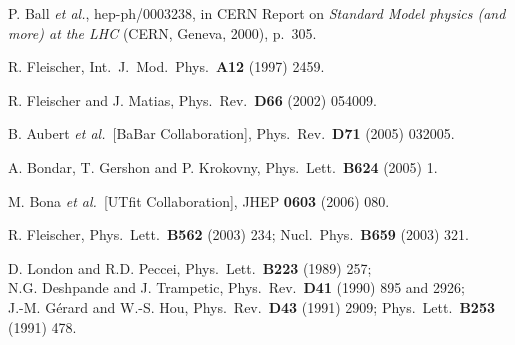 \documentclass[11pt]{cernrep}
\begin{document}
\begin{thebibliography}{999}
P. Ball {\it et al.}, hep-ph/0003238,
in CERN Report on {\it Standard Model physics (and more) at
the LHC} (CERN, Geneva, 2000), p.\ 305.

R. Fleischer,
  { Int.\ J.\ Mod.\ Phys.}~{\bf A12} (1997) 2459.

R. Fleischer and J. Matias,
  { Phys.\ Rev.}~{\bf D66} (2002) 054009.

B. Aubert {\it et al.}\  [BaBar Collaboration],
  { Phys.\ Rev.}~{\bf D71} (2005) 032005.
  
A. Bondar, T. Gershon and P. Krokovny,
  { Phys.\ Lett.}~{\bf B624} (2005) 1.
  
  M. Bona {\it et al.}\  [UTfit Collaboration],
 JHEP {\bf 0603} (2006) 080.
 
R. Fleischer,
  { Phys.\ Lett.}~{\bf B562} (2003) 234;
  { Nucl.\ Phys.}~{\bf B659} (2003) 321.

D. London and R.D. Peccei,
{ Phys.\ Lett.}~{\bf B223} (1989) 257;\\
N.G. Deshpande and J. Trampetic,  
{ Phys.\ Rev.}~{\bf D41} (1990) 895 and 2926;\\
J.-M. G\'erard and W.-S. Hou, { Phys.\ Rev.}~{\bf D43} (1991) 2909; 
{ Phys.\ Lett.}~{\bf B253} (1991) 478.



\end{thebibliography}
\end{document}
